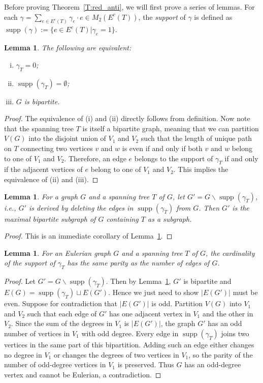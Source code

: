 \documentclass[11pt]{amsart}
\renewcommand{\setminus}{\mathbin{\backslash}}%
\theoremstyle{plain}
\newtheorem{lemma}[theorem]{Lemma}
\theoremstyle{definition}
\DeclareMathOperator{\supp}{\operatorname{supp}}
\numberwithin{equation}{section}
\begin{document}
Before proving Theorem~\ref{T:red_anti}, we will first prove a series of lemmas. For each $\gamma=\sum_{e\in E^c(T)}\gamma_e\cdot e\in M_2(E^c(T) )$, the \emph{support} of $\gamma$ is defined as $\supp(\gamma):=\{e\in E^c(T)|\gamma_e=1\}$. 

\begin{lemma}\label{L:bipartite}
The following are equivalent:
\begin{enumerate}[(i)]
\item $\gamma_T=0$;
\item $\supp(\gamma_T)= \emptyset$;
\item $G$ is bipartite. 
\end{enumerate}
\end{lemma}
\begin{proof}
The equivalence of (i) and (ii) directly follows from definition. 
Now note that the spanning tree $T$ is itself a bipartite graph, meaning that we can partition $V(G)$ into the disjoint union of $V_1$ and $V_2$ such that the length of unique path on $T$ connecting two vertices $v$ and $w$ is even if and only if both $v$ and $w$ belong to one of $V_1$ and $V_2$. Therefore, an edge $e$ belongs to the support of $\gamma_T$ if and only if the adjacent vertices of $e$ belong to one of $V_1$ and $V_2$. This implies the equivalence of (ii) and (iii). 
\end{proof}

\begin{lemma} \label{L:max_bipartite}
For a graph $G$ and a spanning tree $T$ of $G$, let $G'=G\setminus \supp(\gamma_T)$, i.e., $G'$ is derived by deleting the edges in $\supp(\gamma_T)$ from $G$. Then $G'$ is the maximal bipartite subgraph of $G$ containing $T$ as a subgraph. 
\end{lemma}
\begin{proof}
This is an immediate corollary of Lemma~\ref{L:bipartite}. 
\end{proof}

\begin{lemma} \label{L:parity}
For an Eulerian graph $G$ and a spanning tree $T$ of $G$, the cardinality of the support of $\gamma_T$ has the same parity as the number of edges of $G$. 
\end{lemma}

\begin{proof}
Let $G'=G\setminus \supp(\gamma_T)$. Then by Lemma~\ref{L:max_bipartite}, $G'$ is bipartite and $E(G)=\supp(\gamma_T)\sqcup E(G')$. Hence we just need to show $|E(G')|$ must be even. Suppose for contradiction that $|E(G')|$ is odd. Partition $V(G)$ into $V_1$ and $V_2$ such that each edge of $G'$ has one adjacent vertex in $V_1$ and the other in $V_2$. Since the sum of the degrees in $V_1$ is $|E(G')|$, the graph $G'$ has an odd number of vertices in $V_1$ with odd degree. Every edge in $\supp(\gamma_T)$ joins two vertices in the same part of this bipartition. Adding such an edge either changes no degree in $V_1$ or changes the degrees of two vertices in $V_1$, so the parity of the number of odd-degree vertices in $V_1$ is preserved. Thus $G$ has an odd-degree vertex and cannot be Eulerian, a contradiction. 
\end{proof}
\end{document}
